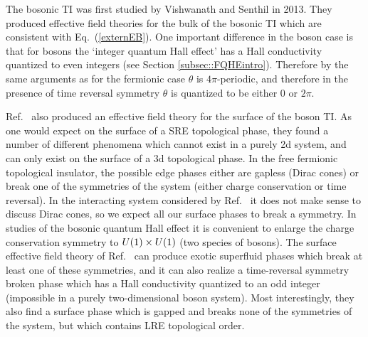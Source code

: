 The bosonic TI was first studied by Vishwanath and Senthil in 2013\cite{SenthilVishwanath}. They produced effective field theories for the bulk of the bosonic TI which are consistent with Eq.~(\ref{externEB}). One important difference in the boson case is that for bosons the `integer quantum Hall effect' has a Hall conductivity quantized to even integers (see Section \ref{subsec::FQHEintro}). Therefore by the same arguments as for the fermionic case $\theta$ is $4\pi$-periodic, and therefore in the presence of time reversal symmetry $\theta$ is quantized to be either $0$ or $2\pi$. 

Ref.~\cite{SenthilVishwanath} also produced an effective field theory for the surface of the boson TI. As one would expect on the surface of a SRE topological phase, they found a number of different phenomena which cannot exist in a purely 2d system, and can only exist on the surface of a 3d topological phase. 
In the free fermionic topological insulator, the possible edge phases either are gapless (Dirac cones) or break one of the symmetries of the system (either charge conservation or time reversal). In the interacting system considered by Ref.~\cite{SenthilVishwanath} it does not make sense to discuss Dirac cones, so we expect all our surface phases to break a symmetry. In studies of the bosonic quantum Hall effect it is convenient to enlarge the charge conservation symmetry to $U(1)\times U(1)$ (two species of bosons). The surface effective field theory of Ref.~\cite{SenthilVishwanath} can produce exotic superfluid phases which break at least one of these symmetries, and it can also realize a time-reversal symmetry broken phase which has a Hall conductivity quantized to an odd integer (impossible in a purely two-dimensional boson system). Most interestingly, they also find a surface phase which is gapped and breaks none of the symmetries of the system, but which contains LRE topological order.

